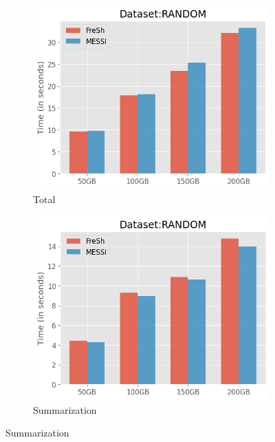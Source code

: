 
\begin{figure}[htbp]
    \centering
    \begin{subfigure}{0.45\textwidth} 
        \includegraphics[width=\textwidth]{figures/Experiments/scale-dataset-random-total.png}
        \caption{Total}
        \label{fig:eval:scale-dataset:random:total}
    \end{subfigure}    
    \begin{subfigure}{0.45\textwidth}
        \includegraphics[width=\textwidth]{figures/Experiments/scale-dataset-random-summarization.png}
        \caption{Summarization}
        \label{fig:eval:scale-dataset:random:summarization}
    \end{subfigure}    


\end{figure}
